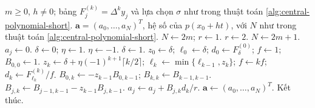 \documentclass[12pt,a4paper,oneside]{book}
\numberwithin{algorithm}{chapter}
\theoremstyle{definition}
\begin{document}
\begin{algorithm}[H]
\caption{Đa thức Gauss, Stirling hoặc Bessel: chi tiết}
\label{alg:central-polynomial}
\begin{algorithmic}[1]
\Require $m\geq0$, $h\ne0$; bảng $F_j^{(k)}=\Delta^ky_j$ và lựa chọn $\sigma$ như trong thuật toán \ref{alg:central-polynomial-short}.
\Ensure $\boldsymbol a=(a_0,\ldots,a_N)^T$, hệ số của $p(x_0+ht)$, với $N$ như trong thuật toán \ref{alg:central-polynomial-short}.
\State $N\gets2m$; $r\gets1$.
 \State $r\gets2$.
\EndIf
{}
 \State $N\gets2m+1$.
\EndIf
\Statex
{}
 \State $a_j\gets0$.
\EndFor
\Statex
{}
 \State $\delta\gets0$; $\eta\gets1$.
  \State $\eta\gets-1$.
 \EndIf
  \State $\delta\gets1$.
 \EndIf
 \State $z_0\gets\delta$; $\ell_0\gets\delta$; $d_0\gets F_{\delta}^{(0)}$; $f\gets1$; $B_{0,0}\gets1$.
  \State $z_k\gets\delta+\eta(-1)^{k+1}\lceil k/2\rceil$; $\ell_k\gets\min\{\ell_{k-1},z_k\}$; $f\gets kf$; $d_k\gets F_{\ell_k}^{(k)}/f$.
  \State $B_{0,k}\gets-z_{k-1}B_{0,k-1}$; $B_{k,k}\gets B_{k-1,k-1}$.
   \State $B_{j,k}\gets B_{j-1,k-1}-z_{k-1}B_{j,k-1}$.
  \EndFor
 \EndFor
 \Statex
   \State $a_j\gets a_j+B_{j,k}d_k/r$.
  \EndFor
 \EndFor
\EndFor
\Statex
\State $\boldsymbol a\gets(a_0,\ldots,a_N)^T$.
\State Kết thúc.
\end{algorithmic}
\end{algorithm}
\end{document}
